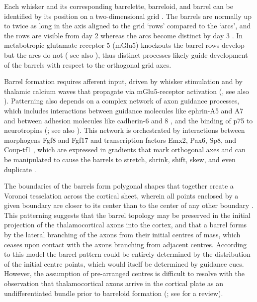 \documentclass[9pt,twocolumn,twoside,lineno]{pnas-new}
\begin{document}
Each whisker and its corresponding barrelette, barreloid, and barrel can be
identified by its position on a two-dimensional grid
\citep{zucker_coding_1969,killackey_pattern_1980,van_der_loos_barreloids_1976,haidarliu_size_2001}. The barrels are normally up to
twice as long in the axis aligned to the grid ‘rows’ compared to the ‘arcs’,
and the rows are visible from day 2 \citep{rebsam_refinement_2002} whereas the arcs become
distinct by day 3 \citep{erzurumlu_development_2012,rebsam_refinement_2002}. In metabotropic glutamate
receptor 5 (mGlu5) knockouts the barrel rows develop but the arcs do not
(\citealp{hannan_plc-1_2001} see also \citealp{fox_barrel_2008}), thus distinct processes
likely guide development of the barrels with respect to the orthogonal grid
axes.

Barrel formation requires afferent input, driven by whisker stimulation and by
thalamic calcium waves that propagate via mGlu5-receptor activation
(\citealp{anton-bolanos_prenatal_2019}, see also \citealp{anton-bolanos_developmental_2018}). Patterning also depends
on a complex network of axon guidance processes, which includes interactions
between guidance molecules like ephrin-A5 and A7 \citep{miller_epha7-ephrin-a5_2006} and
between adhesion molecules like cadherin-6 and 8 \citep{greig_molecular_2013,bishop_regulation_2000},
and the binding of p75 to neurotropins (\citealp{shimogori_fibroblast_2005,bishop_distinct_2002};
see also \citealp{dye_lifespan_2011,dye_lifespan_2011-1}). This network is orchestrated by
interactions between morphogens Fgf8 and Fgf17 and transcription factors Emx2,
Pax6, Sp8, and Coup-tf1 \citep{shimogori_fibroblast_2005,bishop_regulation_2000}, which are expressed
in gradients that mark orthogonal axes and can be manipulated to cause the
barrels to stretch, shrink, shift, skew, and even duplicate
\citep{shimogori_fibroblast_2005,assimacopoulos_fibroblast_2012,borello_sp8_2014,sahara_sp8_2007,ypsilanti_transcriptional_2016,sur_patterning_2005}.

The boundaries of the barrels form polygonal shapes that together
create a Voronoi tesselation across the cortical sheet, wherein all
points enclosed by a given boundary are closer to its center than to
the center of any other boundary \citep{senft_mouse_1991}. This
patterning suggests that the barrel topology may be preserved in the
initial projection of the thalamocortical axons into the cortex, and
that a barrel forms by the lateral branching of the axons from their
initial centres of mass, which ceases upon contact with the axons
branching from adjacent centres. According to this model the barrel
pattern could be entirely determined by the distribution of the
initial centre points, which would itself be determined by guidance
cues. However, the assumption of pre-arranged centres is difficult to
resolve with the observation that thalamocortical axons arrive in the
cortical plate as an undifferentiated bundle prior to barreloid
formation (\citealp{agmon_organized_1993}; see \citealp{erzurumlu_development_2012} for a review).
\end{document}

